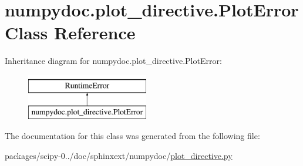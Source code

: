 \hypertarget{classnumpydoc_1_1plot__directive_1_1PlotError}{}\section{numpydoc.\+plot\+\_\+directive.\+Plot\+Error Class Reference}
\label{classnumpydoc_1_1plot__directive_1_1PlotError}
Inheritance diagram for numpydoc.\+plot\+\_\+directive.\+Plot\+Error\+:\begin{figure}[H]
\begin{center}
\leavevmode
\includegraphics[height=2.000000cm]{classnumpydoc_1_1plot__directive_1_1PlotError}
\end{center}
\end{figure}


The documentation for this class was generated from the following file\+:\begin{DoxyCompactItemize}
\item 
packages/scipy-\/0../doc/sphinxext/numpydoc/\hyperlink{plot__directive_8py}{plot\+\_\+directive.\+py}\end{DoxyCompactItemize}
